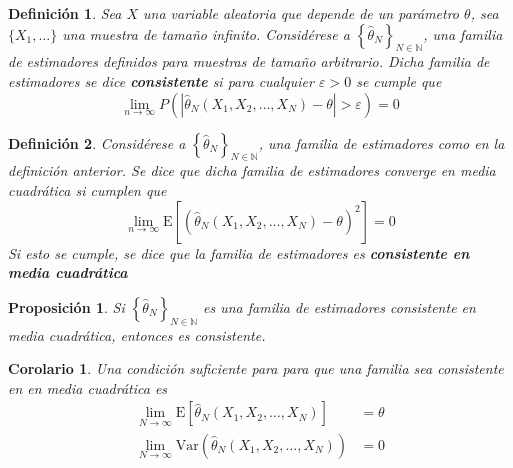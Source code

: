 \documentclass[12pt,letterpaper]{book}
\newtheorem{definicion}{Definición}[chapter]
\newtheorem{proposicion}[teorema]{Proposición}
\newtheorem{corolario}[teorema]{Corolario}
\newcommand{\N}{\mathbb{N}}
\newcommand{\E}[1]{\mathrm{E}\left[ #1 \right]}
\newcommand{\Var}[1]{\mathrm{Var}\left( #1 \right)}
\newcommand{\abso}[1]{\left| #1 \right|}
\begin{document}
\begin{definicion}
Sea $X$ una variable aleatoria que depende de un parámetro $\theta$, sea $\{ X_1, \dots\}$ una muestra de tamaño infinito.
%
Considérese a $\left\{ \widehat{\theta}_N \right\}_{N\in \N}$, una familia de estimadores definidos para muestras de tamaño arbitrario. 
%
Dicha familia de estimadores se dice \textbf{consistente} si para cualquier $\varepsilon > 0$ se cumple que
\begin{equation}
\lim_{n\rightarrow\infty} P\left( \abso{\widehat{\theta}_N(X_1,X_2,\dots,X_N)-\theta} > \varepsilon \right) = 0
\end{equation}
\end{definicion}

\begin{definicion}
Considérese a $\left\{ \widehat{\theta}_N \right\}_{N\in \N}$, una familia de estimadores como en la definición anterior.
%
Se dice que dicha familia de estimadores \textit{converge en media cuadrática} si cumplen que
\begin{equation}
\lim_{n\rightarrow\infty} \E{\left( \widehat{\theta}_N(X_1,X_2,\dots,X_N) - \theta \right)^{2}} = 0
\end{equation}
Si esto se cumple, se dice que la familia de estimadores es \textbf{consistente en media cuadrática} \end{definicion}

\begin{proposicion}
Si $\left\{ \widehat{\theta}_N \right\}_{N\in \N}$ es una familia de estimadores consistente en media cuadrática, entonces es consistente.
\end{proposicion}

\begin{corolario}
Una condición suficiente para para que una familia sea consistente en en media cuadrática es
\begin{align}
\lim_{N\rightarrow\infty} \E{\widehat{\theta}_N(X_1,X_2,\dots,X_N)} &= \theta \\
\lim_{N\rightarrow\infty} \Var{\widehat{\theta}_N(X_1,X_2,\dots,X_N)} &= 0
\end{align}
\end{corolario}
\end{document}
